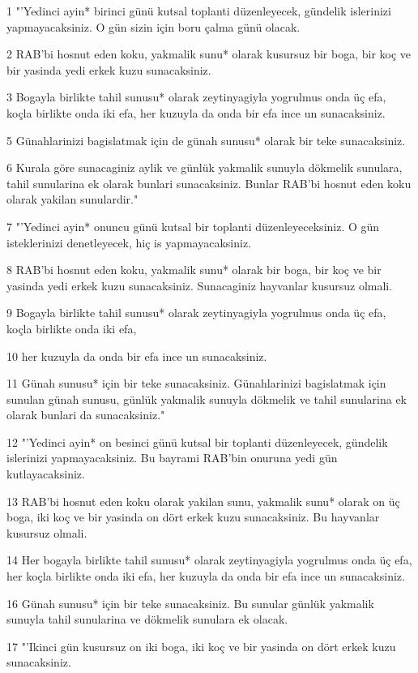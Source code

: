 \par 1 "'Yedinci ayin* birinci günü kutsal toplanti düzenleyecek, gündelik islerinizi yapmayacaksiniz. O gün sizin için boru çalma günü olacak.
\par 2 RAB'bi hosnut eden koku, yakmalik sunu* olarak kusursuz bir boga, bir koç ve bir yasinda yedi erkek kuzu sunacaksiniz.
\par 3 Bogayla birlikte tahil sunusu* olarak zeytinyagiyla yogrulmus onda üç efa, koçla birlikte onda iki efa, her kuzuyla da onda bir efa ince un sunacaksiniz.
\par 5 Günahlarinizi bagislatmak için de günah sunusu* olarak bir teke sunacaksiniz.
\par 6 Kurala göre sunacaginiz aylik ve günlük yakmalik sunuyla dökmelik sunulara, tahil sunularina ek olarak bunlari sunacaksiniz. Bunlar RAB'bi hosnut eden koku olarak yakilan sunulardir."
\par 7 "'Yedinci ayin* onuncu günü kutsal bir toplanti düzenleyeceksiniz. O gün isteklerinizi denetleyecek, hiç is yapmayacaksiniz.
\par 8 RAB'bi hosnut eden koku, yakmalik sunu* olarak bir boga, bir koç ve bir yasinda yedi erkek kuzu sunacaksiniz. Sunacaginiz hayvanlar kusursuz olmali.
\par 9 Bogayla birlikte tahil sunusu* olarak zeytinyagiyla yogrulmus onda üç efa, koçla birlikte onda iki efa,
\par 10 her kuzuyla da onda bir efa ince un sunacaksiniz.
\par 11 Günah sunusu* için bir teke sunacaksiniz. Günahlarinizi bagislatmak için sunulan günah sunusu, günlük yakmalik sunuyla dökmelik ve tahil sunularina ek olarak bunlari da sunacaksiniz."
\par 12 "'Yedinci ayin* on besinci günü kutsal bir toplanti düzenleyecek, gündelik islerinizi yapmayacaksiniz. Bu bayrami RAB'bin onuruna yedi gün kutlayacaksiniz.
\par 13 RAB'bi hosnut eden koku olarak yakilan sunu, yakmalik sunu* olarak on üç boga, iki koç ve bir yasinda on dört erkek kuzu sunacaksiniz. Bu hayvanlar kusursuz olmali.
\par 14 Her bogayla birlikte tahil sunusu* olarak zeytinyagiyla yogrulmus onda üç efa, her koçla birlikte onda iki efa, her kuzuyla da onda bir efa ince un sunacaksiniz.
\par 16 Günah sunusu* için bir teke sunacaksiniz. Bu sunular günlük yakmalik sunuyla tahil sunularina ve dökmelik sunulara ek olacak.
\par 17 "'Ikinci gün kusursuz on iki boga, iki koç ve bir yasinda on dört erkek kuzu sunacaksiniz.
